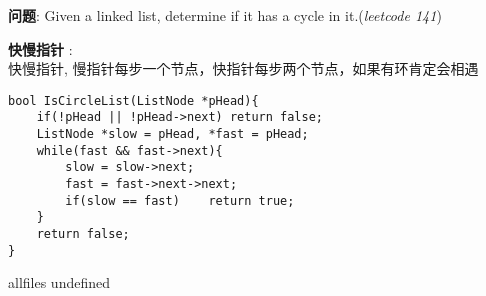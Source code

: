 \documentclass{article}
\begin{document}
\begin{CJK}{UTF8}{gbsn}     %

\else
    
\begin{description}
    \item{\textbf{问题}}: Given a linked list, determine if it has a cycle in it.(\textit{leetcode 141})
    \item{\textbf{快慢指针}} : 
    \\快慢指针, 慢指针每步一个节点，快指针每步两个节点，如果有环肯定会相遇
    \begin{lstlisting}
bool IsCircleList(ListNode *pHead){
	if(!pHead || !pHead->next) return false;
	ListNode *slow = pHead, *fast = pHead;
	while(fast && fast->next){
		slow = slow->next;
		fast = fast->next->next;
		if(slow == fast)	return true;
	}
	return false;
}
    \end{lstlisting}
\end{description}

\fi

\ifx allfiles undefined
\end{CJK}
\end{document}
